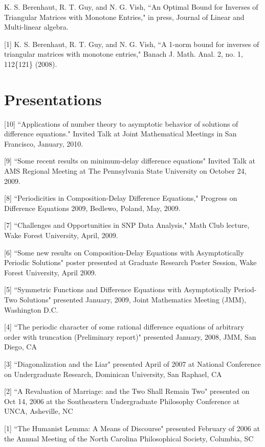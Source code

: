 \documentclass[overlapped,line,letterpaper]{res}
\begin{document}
\begin{resume}
[2] K. S. Berenhaut, R. T. Guy, and N. G. Vish, ``An Optimal Bound for Inverses of Triangular Matrices with Monotone Entries," in press, Journal of Linear and Multi-linear algebra.

[1] K. S. Berenhaut, R. T. Guy, and N. G. Vish, ``A 1-norm bound for inverses of triangular matrices
with monotone entries," Banach J. Math. Anal. 2, no. 1, 112\{121\}  (2008).



\section{\bf Presentations}
%
[10] ``Applications of number theory to asymptotic behavior of solutions of difference equations."  Invited Talk at Joint Mathematical Meetings in San Francisco, January, 2010.

[9] ``Some recent results on minimum-delay difference equations" Invited Talk at AMS Regional Meeting at The Pennsylvania State University on October 24, 2009.

[8] ``Periodicities in Composition-Delay Difference Equations," Progress on Difference Equations 2009, Bedlewo, Poland, May, 2009.

[7] ``Challenges and Opportunities in SNP Data Analysis," Math Club lecture, Wake Forest University, April, 2009. 

[6] ``Some new results on Composition-Delay Equations with Asymptotically Periodic Solutions" poster presented at Graduate Research Poster Session, Wake Forest University, April 2009.

[5] ``Symmetric Functions and Difference Equations with Asymptotically Period-Two Solutions" presented January, 2009, Joint Mathematics Meeting (JMM), Washington D.C.

[4] ``The periodic character of some rational difference equations of arbitrary order with truncation (Preliminary report)" presented January, 2008, JMM, San Diego, CA

[3] ``Diagonalization and the Liar" presented April of 2007 at National Conference on Undergraduate Research, Dominican University, San Raphael, CA

[2] ``A Revaluation of Marriage: and the Two Shall Remain Two" presented on Oct 14, 2006 at the Southeastern Undergraduate Philosophy Conference at UNCA, Asheville, NC

[1] ``The Humanist Lemma: A Means of Discourse" presented February of 2006 at the Annual Meeting of the North Carolina Philosophical Society, Columbia, SC


\end{resume}
\end{document}
